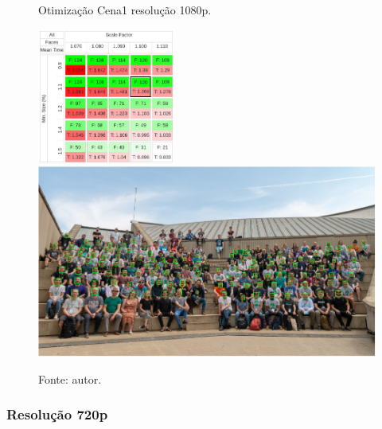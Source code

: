 \begin{figure}[h]
    \centering
    \caption[Otimização Cena1 resolução 1080p.]{Otimização Cena1 resolução 1080p.}
    \includegraphics[width=0.4\textwidth]{Cap4_Experimentos_Realizados/Figures/cena1_param_1080p_matriz.jpg}
    \includegraphics[width=1.0\textwidth]{Cap4_Experimentos_Realizados/Figures/cena1_param_1080p_faces.jpg}
    \caption*{Fonte: autor.}
    \label{fig:otimizacaoCena1_1080p}
\end{figure}

\subsubsection{Resolução 720p}

